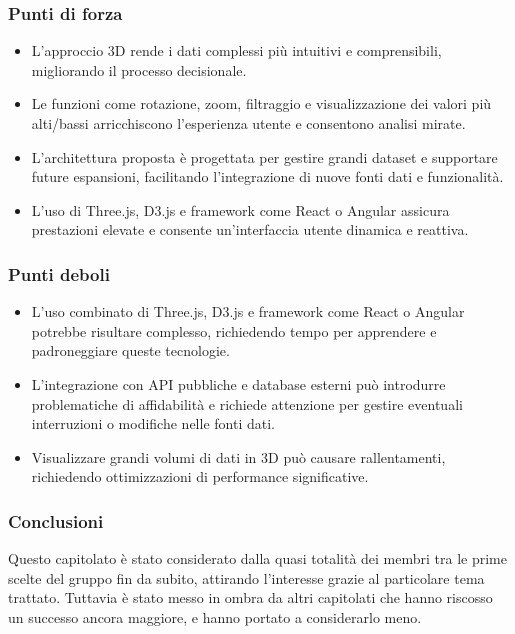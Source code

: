     \subsubsection{Punti di forza}
        \begin{itemize}
            \item L’approccio 3D rende i dati complessi più intuitivi e comprensibili, migliorando il processo decisionale.
            \item Le funzioni come rotazione, zoom, filtraggio e visualizzazione dei valori più alti/bassi arricchiscono l’esperienza utente e consentono analisi mirate.
            \item L’architettura proposta è progettata per gestire grandi dataset e supportare future espansioni, facilitando l’integrazione di nuove fonti dati e funzionalità.
            \item L’uso di Three.js, D3.js e framework come React o Angular assicura prestazioni elevate e consente un’interfaccia utente dinamica e reattiva.
        \end{itemize}
    \subsubsection{Punti deboli}
        \begin{itemize}
            \item L’uso combinato di Three.js, D3.js e framework come React o Angular potrebbe risultare complesso, richiedendo tempo per apprendere e padroneggiare queste tecnologie.
            \item L’integrazione con API pubbliche e database esterni può introdurre problematiche di affidabilità e richiede attenzione per gestire eventuali interruzioni o modifiche nelle fonti dati.
            \item Visualizzare grandi volumi di dati in 3D può causare rallentamenti, richiedendo ottimizzazioni di performance significative.
        \end{itemize}
    \subsubsection{Conclusioni}
        Questo capitolato è stato considerato dalla quasi totalità dei membri tra le prime scelte del gruppo fin da subito, attirando l’interesse grazie al particolare tema trattato. Tuttavia è stato messo in ombra da altri capitolati che hanno riscosso un successo ancora maggiore, e hanno portato a considerarlo meno.



